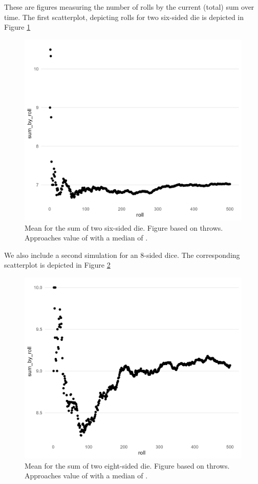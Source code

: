\documentclass[12pt]{article}
\theoremstyle{definition}
\begin{document}
\newpage

These are figures measuring the number of rolls by the current (total) sum over time. The first scatterplot, depicting rolls for two six-sided die is depicted in Figure \ref{fig:scatter_baseline} 
\begin{figure}[tbh!]
\centering
\includegraphics[width=.8\linewidth]{plot/baseline/lln_plot_baseline.png}
\caption[]{Mean for the sum of two six-sided die. Figure based on throws. Approaches value of  with a median of .}
\label{fig:scatter_baseline}
\end{figure}

\newpage

We also include a second simulation for an 8-sided dice. The corresponding scatterplot is depicted in Figure 
\ref{fig:scatter_8side} 
\begin{figure}[tbh!]
\centering
\includegraphics[width=.8\linewidth]{plot/500_8/lln_plot_500_8.png}
\caption[]{Mean for the sum of two eight-sided die. Figure based on throws. Approaches value of  with a median of .}
\label{fig:scatter_8side}
\end{figure}
\end{document}
